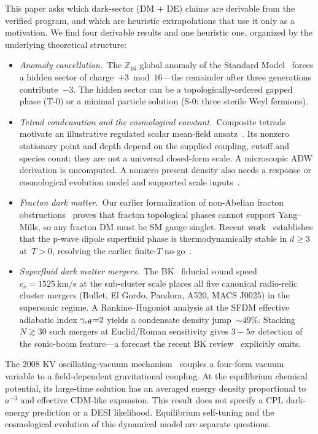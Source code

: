 \documentclass[aps,prd,twocolumn,showpacs,superscriptaddress,nofootinbib]{revtex4-2}
\begin{document}
This paper asks which dark-sector (DM + DE) claims are derivable from the
verified program, and which are heuristic extrapolations that use it only
as a motivation. We find four derivable results and one heuristic one,
organized by the underlying theoretical structure:
\begin{itemize}
\item \emph{Anomaly cancellation.}~The $\mathbb{Z}_{16}$ global anomaly of
the Standard Model~\cite{Wan2019,Wang2020,Garcia-Etxebarria2019} forces a
hidden sector of charge~$+3 \bmod 16$—the remainder after three generations
contribute~$-3$. The hidden sector can be a topologically-ordered gapped
phase (T-0) or a minimal particle solution (S-0: three sterile Weyl
fermions).
\item \emph{Tetrad condensation and the cosmological constant.}~Composite
tetrads motivate an illustrative regulated scalar mean-field
ansatz~\cite{Diakonov2011}. Its nonzero stationary point and depth depend
on the supplied coupling, cutoff and species count; they are not a
universal closed-form scale. A microscopic ADW derivation is uncomputed.
A nonzero present density also needs a response or cosmological evolution
model and supported scale inputs~\cite{Volovik2021CombinedLorentz,Volovik2024DeSitterThermodynamics}.
\item \emph{Fracton dark matter.}~Our earlier formalization of
non-Abelian fracton obstructions~\cite{FractonNonAbelian2025} proves that fracton
topological phases cannot support Yang--Mills, so any fracton DM must be
SM gauge singlet. Recent work~\cite{Kapustin2022,Jensen2024,Glodkowski2024,%
Feistl2026} establishes that the p-wave dipole superfluid phase is
thermodynamically stable in $d{\geq}3$ at~$T{>}0$, resolving the
earlier finite-$T$ no-go~\cite{Krishna2024}.
\item \emph{Superfluid dark matter mergers.}~The BK~\cite{BK2015,BK2025}
fiducial sound speed $c_s = \SI{1525}{\kilo\meter/\second}$ at the
sub-cluster scale places all five canonical radio-relic cluster mergers
(Bullet, El Gordo, Pandora, A520, MACS J0025) in the supersonic regime.
A Rankine--Hugoniot analysis at the SFDM effective adiabatic index
$\gamma_{\rm eff}{=}2$ yields a condensate density jump~${\sim}49\%$.
Stacking~$N \gtrsim 30$ such mergers at Euclid/Roman sensitivity gives
$3{-}5\sigma$ detection of the sonic-boom feature—a forecast the
recent BK review~\cite{BK2025} explicitly omits.
\end{itemize}

The 2008 KV oscillating-vacuum mechanism~\cite{KV2008b} couples a four-form
vacuum variable to a field-dependent gravitational coupling. At the
equilibrium chemical potential, its large-time solution has an averaged
energy density proportional to $a^{-3}$ and effective CDM-like expansion.
This result does not specify a CPL dark-energy prediction or a DESI
likelihood. Equilibrium self-tuning and the cosmological evolution of
this dynamical model are separate questions.
\end{document}
